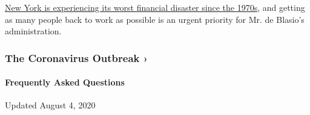 \href{https://www.nytimes.com/2020/07/07/nyregion/nyc-unemployment.html}{New
York is experiencing its worst financial disaster since the 1970s}, and
getting as many people back to work as possible is an urgent priority
for Mr. de Blasio's administration.

\href{https://www.nytimes.com/news-event/coronavirus?action=click\&pgtype=Article\&state=default\&region=MAIN_CONTENT_3\&context=storylines_faq}{}

\hypertarget{the-coronavirus-outbreak-}{%
\subsubsection{The Coronavirus Outbreak
›}\label{the-coronavirus-outbreak-}}

\hypertarget{frequently-asked-questions}{%
\paragraph{Frequently Asked
Questions}\label{frequently-asked-questions}}

Updated August 4, 2020

